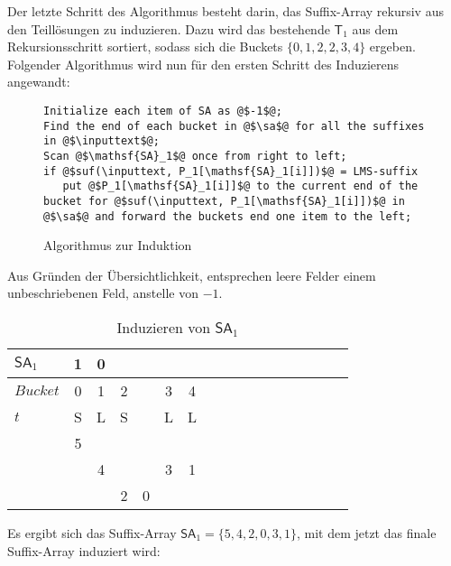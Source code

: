 \noindent Der letzte Schritt des Algorithmus besteht darin, das Suffix-Array \sa rekursiv aus den Teillösungen zu induzieren. Dazu wird das bestehende $\mathsf{T}_1$ aus dem Rekursionsschritt sortiert, sodass sich die Buckets $\{0,1,2,2,3,4\}$ ergeben. Folgender Algorithmus wird nun für den ersten Schritt des Induzierens angewandt\cite[Kap.~4.5]{saca:6}:\newpage
\begin{figure}[h]
\begin{verbatim}
Initialize each item of SA as @$-1$@;
Find the end of each bucket in @$\sa$@ for all the suffixes in @$\inputtext$@;
Scan @$\mathsf{SA}_1$@ once from right to left;
if @$suf(\inputtext, P_1[\mathsf{SA}_1[i]])$@ = LMS-suffix
   put @$P_1[\mathsf{SA}_1[i]]$@ to the current end of the bucket for @$suf(\inputtext, P_1[\mathsf{SA}_1[i]])$@ in @$\sa$@ and forward the buckets end one item to the left;	   
\end{verbatim}
\caption{Algorithmus zur Induktion}
\end{figure}

\noindent Aus Gründen der Übersichtlichkeit, entsprechen leere Felder einem unbeschriebenen Feld, anstelle von $-1$.

\begin{table}[H]
\centering
  \begin{tabular}{ | l | c | c | c | c | c | c | c | c | c | c | c | c | c | c | c | c | }
    \hline
     $\mathsf{SA}_1$ & 1 & 0 & & & & \\ \hline
   $Bucket$ & 0 & 1 & \multicolumn{1}{c}{2} & & 3 & 4 \\ \hline
      $t$   & S & L & \multicolumn{1}{c}{S} & & L & L \\ \hline
            & 5 & & & & &  \\ \hline
            & & 4 & & & 3 & 1 \\ \hline
            & & & 2 & 0 & & \\
    \hline
  \end{tabular}
  \caption{Induzieren von $\mathsf{SA}_1$}
\end{table}
\bigskip

\noindent Es ergibt sich das Suffix-Array $\mathsf{SA}_1 = \{5, 4, 2, 0, 3, 1\}$, mit dem jetzt das finale Suffix-Array \sa induziert wird:

